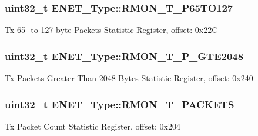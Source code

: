 \subsubsection[{\texorpdfstring{R\+M\+O\+N\+\_\+\+T\+\_\+\+P65\+T\+O127}{RMON_T_P65TO127}}]{ uint32\+\_\+t E\+N\+E\+T\+\_\+\+Type\+::\+R\+M\+O\+N\+\_\+\+T\+\_\+\+P65\+T\+O127}\hypertarget{structENET__Type_a6f9b0875a6260dbe281033eceae709b8}{}\label{structENET__Type_a6f9b0875a6260dbe281033eceae709b8}
Tx 65-\/ to 127-\/byte Packets Statistic Register, offset\+: 0x22C 
\subsubsection[{\texorpdfstring{R\+M\+O\+N\+\_\+\+T\+\_\+\+P\+\_\+\+G\+T\+E2048}{RMON_T_P_GTE2048}}]{ uint32\+\_\+t E\+N\+E\+T\+\_\+\+Type\+::\+R\+M\+O\+N\+\_\+\+T\+\_\+\+P\+\_\+\+G\+T\+E2048}\hypertarget{structENET__Type_a46092252ad8a22149589f62d8a3a1b28}{}\label{structENET__Type_a46092252ad8a22149589f62d8a3a1b28}
Tx Packets Greater Than 2048 Bytes Statistic Register, offset\+: 0x240 
\subsubsection[{\texorpdfstring{R\+M\+O\+N\+\_\+\+T\+\_\+\+P\+A\+C\+K\+E\+TS}{RMON_T_PACKETS}}]{ uint32\+\_\+t E\+N\+E\+T\+\_\+\+Type\+::\+R\+M\+O\+N\+\_\+\+T\+\_\+\+P\+A\+C\+K\+E\+TS}\hypertarget{structENET__Type_adfaeef016c09ca3c1ca7563bbdaffebe}{}\label{structENET__Type_adfaeef016c09ca3c1ca7563bbdaffebe}
Tx Packet Count Statistic Register, offset\+: 0x204 
